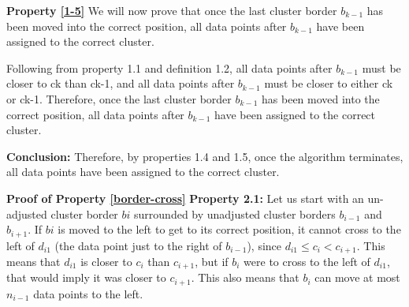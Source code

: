 \documentclass[conference]{IEEEtran}
\newtheorem{proofprp}{}
\newtheorem{subprp}{Property}[proofprp]
\begin{document}
\textbf{Property \ref{1-5}}
We will now prove that once the last cluster border $b_{k-1}$ has been moved into the correct position, all data points after $b_{k-1}$ have been assigned to the correct cluster.

Following from property 1.1 and definition 1.2, all data points after $b_{k-1}$ must be closer to ck than ck-1, and all data points after $b_{k-1}$ must be closer to either ck or ck-1. Therefore, once the last cluster border $b_{k-1}$ has been moved into the correct position, all data points after $b_{k-1}$ have been assigned to the correct cluster.

\textbf{Conclusion:}
Therefore, by properties 1.4 and 1.5, once the algorithm terminates, all data points have been assigned to the correct cluster.


\noindent{}
\vspace{15px}


\textbf{Proof of Property \ref{border-cross}}
\textbf{Property 2.1:}
Let us start with an un-adjusted cluster border $bi$ surrounded by unadjusted cluster borders $b_{i-1}$ and $b_{i+1}$.
If $bi$ is moved to the left to get to its correct position, it cannot cross to the left of $d_{i1}$ (the data point just to the right of $b_{i-1}$), since $d_{i1} \leq c_i < c_{i+1}$.
This means that $d_{i1}$ is closer to $c_i$ than $c_{i+1}$, but if $b_i$ were to cross to the left of $d_{i1}$, that would imply it was closer to $c_{i+1}$.
This also means that $b_i$ can move at most $n_{i-1}$ data points to the left.
\end{document}

